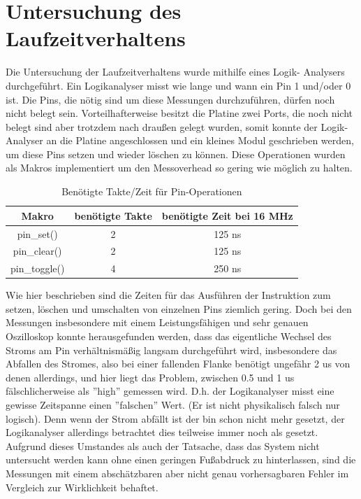 \chapter{Untersuchung des Laufzeitverhaltens}
Die Untersuchung der Laufzeitverhaltens wurde mithilfe eines Logik-
Analysers durchgeführt. Ein Logikanalyser misst wie lange und wann
ein Pin 1 und/oder 0 ist. Die Pins, die nötig sind um diese Messungen
durchzuführen, dürfen noch nicht belegt sein. Vorteilhafterweise
besitzt die Platine zwei Ports, die noch nicht belegt sind aber
trotzdem nach draußen gelegt wurden, somit konnte der Logik-
Analyser an die Platine angeschlossen und ein kleines Modul
geschrieben werden, um diese Pins setzen und wieder löschen zu
können. Diese Operationen wurden als Makros implementiert um den
Messoverhead so gering wie möglich zu halten.
\begin{table}[htb]
\begin{center}
	\begin{tabular}{|c||c|c|}
		\hline
		\textbf{Makro} & \textbf{benötigte Takte} & \textbf{benötigte Zeit bei 16 MHz} \\ \hline \hline
		pin\_set() & 2 & 125 ns \\ \hline
		pin\_clear() & 2 & 125 ns \\ \hline
		pin\_toggle() & 4 & 250 ns \\ \hline
	\end{tabular}
	\caption{\label{pin_takte} Benötigte Takte/Zeit für Pin-Operationen}
\end{center}
\end{table}
Wie hier beschrieben sind die Zeiten für das Ausführen der Instruktion
zum setzen, löschen und umschalten von einzelnen Pins ziemlich gering.
Doch bei den Messungen insbesondere mit einem Leistungsfähigen und
sehr genauen Oszilloskop konnte herausgefunden werden, dass das eigentliche
Wechsel des Stroms am Pin verhältnismäßig langsam durchgeführt wird,
insbesondere das Abfallen des Stromes, also bei einer fallenden Flanke
benötigt ungefähr 2 us von denen allerdings, und hier liegt das Problem,
zwischen 0.5 und 1 us fälschlicherweise als ''high'' gemessen wird.
D.h. der Logikanalyser misst eine gewisse Zeitspanne einen ''falschen'' Wert.
(Er ist nicht physikalisch falsch nur logisch). Denn wenn der Strom abfällt
ist der bin schon nicht mehr gesetzt, der Logikanalyser allerdings betrachtet
dies teilweise immer noch als gesetzt.
Aufgrund dieses Umstandes als auch der Tatsache, dass das System nicht untersucht
werden kann ohne einen geringen Fußabdruck zu hinterlassen, sind die Messungen mit
einem abschätzbaren aber nicht genau vorhersagbaren Fehler im Vergleich zur
Wirklichkeit behaftet.
